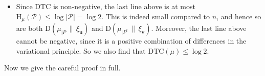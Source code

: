 \documentclass[aop,preprint]{imsart}
\newtheorem{lem}[thm]{Lemma}
\theoremstyle{remark}
\renewcommand{\bf}[1]{\boldsymbol{#1}}
\renewcommand{\rm}[1]{\mathrm{#1}}
\renewcommand{\cal}[1]{\mathcal{#1}}
\newcommand{\rmH}{\mathrm{H}}
\newcommand{\rmb}{\mathrm{b}}
\renewcommand{\d}{\mathrm{d}}
\newcommand{\rmh}{\mathrm{h}}
\renewcommand{\P}{\mathcal{P}}
\newcommand{\DTC}{\mathrm{DTC}}
\newcommand{\rmD}{\mathrm{D}}
\begin{document}
\begin{itemize}
\begin{align}
&= \mu(P)\Big[\rmD(\mu_{|P}) - \int \bf{u}\ \d\mu_{|P}\Big] -\mu(P)\Big[\rmD(\xi_{\bf{u}}) - \int \bf{u}\ \d\xi_{\bf{u}}\Big] \nonumber\\
&\qquad + \mu(P^\rm{c})\Big[\rmD(\mu_{|P^\rm{c}}) - \int \bf{v}\ \d\mu_{|P^\rm{c}}\Big] - \mu(P^\rm{c})\Big[\rmD(\xi_{\bf{v}}) - \int \bf{v}\ \d\xi_{\bf{v}}\Big] \nonumber\\
&= -\DTC(\mu) + \rmH_\mu(\P).
\end{align}
\item Since $\DTC$ is non-negative, the last line above is at most $\rmH_\mu(\P) \leq \log|\P| = \log 2$.  This is indeed small compared to $n$, and hence so are both $\rmD(\mu_{|P}\,\|\,\xi_{\bf{u}})$ and $\rmD(\mu_{|P^{\rm{c}}}\,\|\,\xi_{\bf{v}})$.  Moreover, the last line above cannot be negative, since it is a positive combination of differences in the variational principle. So we also find that $\DTC(\mu) \leq \log 2$.
\end{itemize}

Now we give the careful proof in full.
%
%
\end{document}
